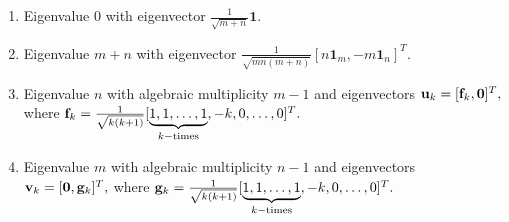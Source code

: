 \documentclass[12pt,a4paper]{article}
\def \f {{\bf f}}
\def \g {{\bf g}}
\def \u {{\bf u}}
\def \v {{\bf v}}
\begin{document}
\begin{enumerate}[label=(\roman*)]
    \item Eigenvalue $0$ with eigenvector $\frac{1}{\sqrt{m+n}}\mathbf{1}.$
    \item Eigenvalue $m+n$ with eigenvector $\frac{1}{\sqrt{mn(m+n)}}[
            n\mathbf{1}_m,
        -m\mathbf{1}_n
        ]^T.$
        \item Eigenvalue $n$ with algebraic multiplicity $m-1$ and eigenvectors $\u_k=[
           \f_k,
        \mathbf{0}]^T,$ where $\f_k=\frac{1}{\sqrt {k(k+1)}}[\underbrace{1,1,\dots,1}_{k-\text{times}},-k,0,\ldots,0]^T.$
        \item Eigenvalue $m$ with algebraic multiplicity $n-1$ and eigenvectors $\v_k=[
        \mathbf{0},\g_k]^T,$ where $\g_k=\frac{1}{\sqrt {k(k+1)}}[\underbrace{1,1,\dots,1}_{k-\text{times}},-k,0,\ldots,0]^T.$ 
\end{enumerate}
\end{document}
